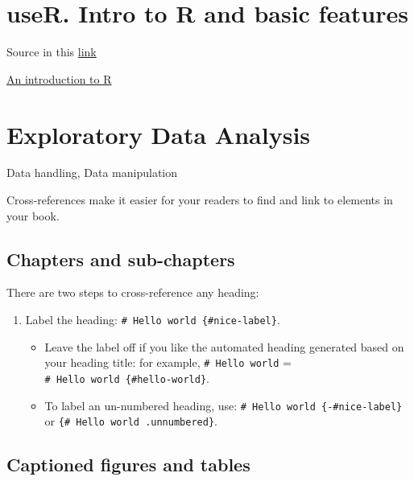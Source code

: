 \documentclass[
]{book}
\providecommand{\tightlist}{%
  \setlength{\itemsep}{0pt}\setlength{\parskip}{0pt}}
\begin{document}
\hypertarget{user.-intro-to-r-and-basic-features}{%
\chapter{\texorpdfstring{\textbf{useR}. Intro to R and basic features}{useR. Intro to R and basic features}}\label{user.-intro-to-r-and-basic-features}}

Source in this \href{https://estadistica-dma.ulpgc.es/cursoR4ULPGC/index.html}{link}

\href{https://intro2r.com/index.html}{An introduction to R}

\hypertarget{exploratory-data-analysis}{%
\chapter{Exploratory Data Analysis}\label{exploratory-data-analysis}}

Data handling, Data manipulation

Cross-references make it easier for your readers to find and link to elements in your book.

\hypertarget{chapters-and-sub-chapters}{%
\section{Chapters and sub-chapters}\label{chapters-and-sub-chapters}}

There are two steps to cross-reference any heading:

\begin{enumerate}
\def\labelenumi{\arabic{enumi}.}
\tightlist
\item
  Label the heading: \texttt{\#\ Hello\ world\ \{\#nice-label\}}.

  \begin{itemize}
  \tightlist
  \item
    Leave the label off if you like the automated heading generated based on your heading title: for example, \texttt{\#\ Hello\ world} = \texttt{\#\ Hello\ world\ \{\#hello-world\}}.
  \item
    To label an un-numbered heading, use: \texttt{\#\ Hello\ world\ \{-\#nice-label\}} or \texttt{\{\#\ Hello\ world\ .unnumbered\}}.
  \end{itemize}
\end{enumerate}

\hypertarget{captioned-figures-and-tables}{%
\section{Captioned figures and tables}\label{captioned-figures-and-tables}}
\end{document}
